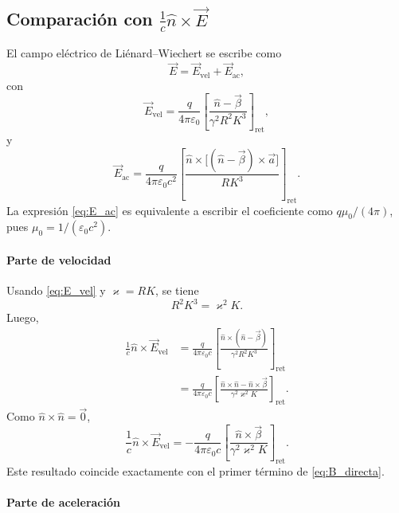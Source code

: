 \documentclass{article}
\numberwithin{equation}{section}
\newcommand{\eps}{\varepsilon_0}
\newcommand{\bv}{\vec{\beta}}
\newcommand{\av}{\vec{a}}
\newcommand{\nh}{\hat{n}}
\newcommand{\K}{K}
\begin{document}
\subsection{Comparaci\'on con $\frac{1}{c}\nh\times\vec{E}$}

El campo el\'ectrico de Li\'enard--Wiechert se escribe como
\begin{equation*}
  \vec{E}=\vec{E}_{\mathrm{vel}}+\vec{E}_{\mathrm{ac}},
\end{equation*}
con
\begin{equation}
  \vec{E}_{\mathrm{vel}}
  =\frac{q}{4\pi\eps}
  \left[
  \frac{\nh-\bv}{\gamma^2R^2\K^3}
  \right]_{\mathrm{ret}},
  \label{eq:E_vel}
\end{equation}
y
\begin{equation}
  \vec{E}_{\mathrm{ac}}
  =\frac{q}{4\pi\eps c^2}
  \left[
  \frac{\nh\times\big[(\nh-\bv)\times\av\big]}{R\K^3}
  \right]_{\mathrm{ret}}.
  \label{eq:E_ac}
\end{equation}
La expresi\'on \eqref{eq:E_ac} es equivalente a escribir el coeficiente como
$q\mu_0/(4\pi)$, pues $\mu_0=1/(\eps c^2)$.

\paragraph{Parte de velocidad}

Usando \eqref{eq:E_vel} y $\varkappa=R\K$, se tiene
\begin{equation*}
  R^2\K^3=\varkappa^2\K.
\end{equation*}
Luego,
\begin{align*}
  \frac{1}{c}\nh\times\vec{E}_{\mathrm{vel}}
  &=\frac{q}{4\pi\eps c}
  \left[
  \frac{\nh\times(\nh-\bv)}{\gamma^2R^2\K^3}
  \right]_{\mathrm{ret}} \\
  &=\frac{q}{4\pi\eps c}
  \left[
  \frac{\nh\times\nh-\nh\times\bv}{\gamma^2\varkappa^2\K}
  \right]_{\mathrm{ret}}.
\end{align*}
Como $\nh\times\nh=\vec{0}$,
\begin{equation}
  \boxed{
  \frac{1}{c}\nh\times\vec{E}_{\mathrm{vel}}
  =-\frac{q}{4\pi\eps c}
  \left[
  \frac{\nh\times\bv}{\gamma^2\varkappa^2\K}
  \right]_{\mathrm{ret}}.
  }
  \label{eq:n_cross_Evel}
\end{equation}
Este resultado coincide exactamente con el primer t\'ermino de
\eqref{eq:B_directa}.

\paragraph{Parte de aceleraci\'on}
\end{document}
